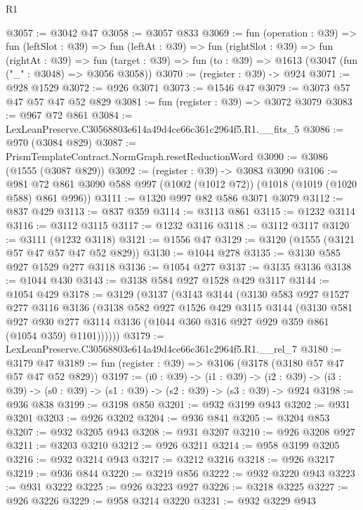 \begin{lexlean}{R1}
\begin{coremodule}
@3057 := @3042 @47
@3058 := @3057 @833
@3069 := fun (operation : @39) =>
  fun (leftSlot : @39) =>
  fun (leftAt : @39) =>
  fun (rightSlot : @39) =>
  fun (rightAt : @39) =>
  fun (target : @39) => fun (to : @39) => @1613 (@3047 (fun ("_" : @3048) => @3056 @3058))
@3070 := (register : @39) -> @924
@3071 := @928 @1529
@3072 := @926 @3071
@3073 := @1546 @47
@3079 := @3073 @57 @47 @57 @47 @52 @829
@3081 := fun (register : @39) => @3072 @3079
@3083 := @967 @72 @861
@3084 := LexLeanPreserve.C30568803e614a49d4ce66c361c2964f5.R1.__fits_5
@3086 := @970 (@3084 @829)
@3087 := PrismTemplateContract.NormGraph.resetReductionWord
@3090 := @3086 (@1555 (@3087 @829))
@3092 := (register : @39) -> @3083 @3090
@3106 := @981 @72 @861 @3090 @588 @997 (@1002 (@1012 @72)) (@1018 (@1019 (@1020 @588) @861 @996))
@3111 := @1320 @997 @82 @586 @3071 @3079
@3112 := @837 @429
@3113 := @837 @359
@3114 := @3113 @861
@3115 := @1232 @3114
@3116 := @3112 @3115
@3117 := @1232 @3116
@3118 := @3112 @3117
@3120 := @3111 (@1232 @3118)
@3121 := @1556 @47
@3129 := @3120 (@1555 (@3121 @57 @47 @57 @47 @52 @829))
@3130 := @1044 @278
@3135 := @3130 @585 @927 @1529 @277 @3118
@3136 := @1054 @277
@3137 := @3135 @3136
@3138 := @1044 @430
@3143 := @3138 @584 @927 @1528 @429 @3117
@3144 := @1054 @429
@3178 := @3129
    (@3137
      (@3143
        @3144
        (@3130
          @583
          @927
          @1527
          @277
          @3116
          @3136
          (@3138
            @582
            @927
            @1526
            @429
            @3115
            @3144
            (@3130
              @581
              @927
              @930
              @277
              @3114
              @3136
              (@1044 @360 @316 @927 @929 @359 @861 (@1054 @359) @1101))))))
@3179 := LexLeanPreserve.C30568803e614a49d4ce66c361c2964f5.R1.__rel_7
@3180 := @3179 @47
@3189 := fun (register : @39) => @3106 (@3178 (@3180 @57 @47 @57 @47 @52 @829))
@3197 := (i0 : @39) ->
  (i1 : @39) ->
  (i2 : @39) -> (i3 : @39) -> (s0 : @39) -> (s1 : @39) -> (s2 : @39) -> (s3 : @39) -> @924
@3198 := @936 @838
@3199 := @3198 @850
@3201 := @932 @3199 @943
@3202 := @931 @3201
@3203 := @926 @3202
@3204 := @936 @841
@3205 := @3204 @853
@3207 := @932 @3205 @943
@3208 := @931 @3207
@3210 := @926 @3208 @927
@3211 := @3203 @3210
@3212 := @926 @3211
@3214 := @958 @3199 @3205
@3216 := @932 @3214 @943
@3217 := @3212 @3216
@3218 := @926 @3217
@3219 := @936 @844
@3220 := @3219 @856
@3222 := @932 @3220 @943
@3223 := @931 @3222
@3225 := @926 @3223 @927
@3226 := @3218 @3225
@3227 := @926 @3226
@3229 := @958 @3214 @3220
@3231 := @932 @3229 @943

\end{coremodule}
\end{lexlean}
